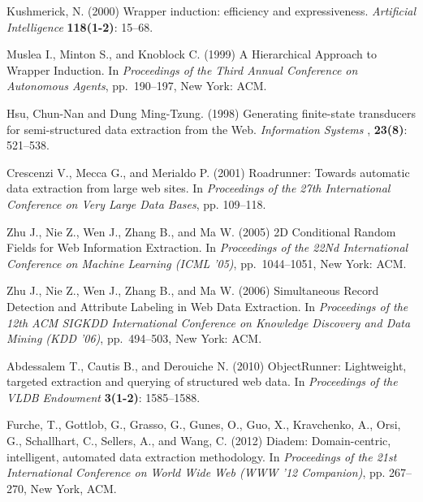 \documentclass{nle}
\begin{document}
\begin{thebibliography}{}

Kushmerick, N. (2000) 
Wrapper induction: efficiency and expressiveness.
{\it Artificial Intelligence\/} 
{\bf 118(1-2)}: 15--68.

Muslea I., Minton S., and Knoblock C. (1999) 
A Hierarchical Approach to Wrapper Induction.
In {\it Proceedings of the Third Annual Conference on Autonomous Agents}, 
pp.~190--197, New York: ACM.

Hsu, Chun-Nan and Dung Ming-Tzung. (1998) 
Generating finite-state transducers for semi-structured data extraction from the Web.
{\it Information Systems \/}, 
{\bf 23(8)}: 521--538.

Crescenzi V., Mecca G., and Merialdo P. (2001)
Roadrunner: Towards automatic data extraction from large web sites.
In {\it Proceedings of the 27th International Conference on Very Large Data Bases}, 
pp. 109--118.

Zhu J., Nie Z., Wen J., Zhang B., and Ma W. (2005)
2D Conditional Random Fields for Web Information Extraction.
In {\it Proceedings of the 22Nd International Conference on Machine Learning (ICML '05)}, 
pp.~1044--1051, New York: ACM.

Zhu J., Nie Z., Wen J., Zhang B., and Ma W. (2006)
Simultaneous Record Detection and Attribute Labeling in Web Data Extraction.
In {\it Proceedings of the 12th ACM SIGKDD International Conference on Knowledge Discovery and Data Mining (KDD '06)}, 
pp.~494--503, New York: ACM.

Abdessalem T., Cautis B., and Derouiche N. (2010)
ObjectRunner: Lightweight, targeted extraction and querying of structured web data.
In {\it Proceedings of the VLDB Endowment}
{\bf 3(1-2)}: 1585--1588.

Furche, T., Gottlob, G., Grasso, G., Gunes, O., Guo, X., Kravchenko, A., Orsi, G., Schallhart, C., Sellers, A., and Wang, C. (2012)
Diadem: Domain-centric, intelligent, automated data extraction methodology.
In {\it Proceedings of the 21st International Conference on World Wide Web (WWW '12 Companion)}, 
pp. 267--270, New York, ACM.


\end{thebibliography}
\end{document}

